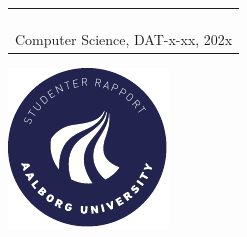 \begin{titlepage}
{{\begin{tabular}{@{}p{\textwidth}@{}}
\begin{center}
{      }
    \end{center}
    \vspace{0.2cm}
   \begin{center}
    {\Large
      Aske, name2, name3%
    }\\
    \vspace{0.2cm}
    {\large
      Computer Science, DAT-x-xx, 202x%
    }
   \end{center}
   \vspace{0.2cm}
   \begin{center}
    {\Large
      Semester Project
    }
   \end{center}
  \end{tabular}}}
  \vfill
  \begin{center}
    \includegraphics[width=0.2\paperwidth]{figures/AAUgraphics/aau_logo_circle_da} %
  \end{center}
\end{titlepage}
\clearpage

